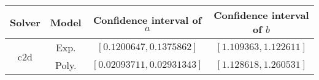 \begin{tabular}{cc|cc} 
\hline 
Solver  & Model  & Confidence interval of $a$  & Confidence interval of $b$ \tabularnewline 
\hline 
\hline 
\multirow{2}{*}{c2d} & Exp. & $\left[0.1200647,0.1375862\right]$ & $\left[1.109363,1.122611\right]$ \tabularnewline 
 & Poly. & $\left[0.02093711,0.02931343\right]$ & $\left[1.128618,1.260531\right]$ \tabularnewline 
\hline 
\end{tabular} 

